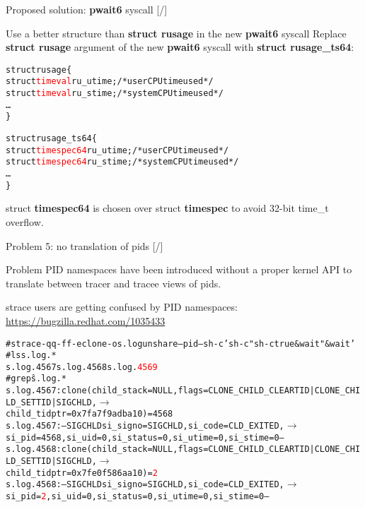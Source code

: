 \documentclass[unicode,aspectratio=169]{beamer}
\begin{document}
\begin{frame}[fragile]{Proposed solution: \textbf{pwait6} syscall \hfill [\insertframenumber/\inserttotalframenumber]}
\begin{block}{Use a better structure than \textbf{struct rusage} in the new \textbf{pwait6} syscall}
Replace \textbf{struct rusage} argument of the new \textbf{pwait6} syscall with \textbf{struct rusage\_ts64}:
\begin{alltt}
struct rusage \{
    struct \textcolor{red}{timeval} ru_utime; /* user CPU time used */
    struct \textcolor{red}{timeval} ru_stime; /* system CPU time used */
    \ldots
\}
\end{alltt}
\begin{alltt}
struct rusage_ts64 \{
    struct \textcolor{red}{timespec64} ru_utime; /* user CPU time used */
    struct \textcolor{red}{timespec64} ru_stime; /* system CPU time used */
    \ldots
\}
\end{alltt}
struct \textbf{timespec64} is chosen over struct \textbf{timespec} to avoid 32-bit time\_t overflow.
\end{block}
\end{frame}

\begin{frame}[fragile]{Problem 5: no translation of pids \hfill [\insertframenumber/\inserttotalframenumber]}
\begin{block}{Problem}
PID namespaces have been introduced without a proper kernel API
to translate between tracer and tracee views of pids.
\end{block}

\begin{block}{strace users are getting confused by PID namespaces: \\ \url{https://bugzilla.redhat.com/1035433}}
\scriptsize
\begin{alltt}
# strace -qq -ff -e clone -o s.log unshare --pid -- sh -c 'sh -c "sh -c true & wait" & wait'
# ls s.log.*
s.log.4567  s.log.4568  s.log.\textcolor{red}{4569}
# grep \^ s.log.*
s.log.4567:clone(child_stack=NULL, flags=CLONE_CHILD_CLEARTID|CLONE_CHILD_SETTID|SIGCHLD, \(\longrightarrow\)
           child_tidptr=0x7fa7f9adba10) = 4568
s.log.4567:--- SIGCHLD {si_signo=SIGCHLD, si_code=CLD_EXITED, \(\longrightarrow\)
           si_pid=4568, si_uid=0, si_status=0, si_utime=0, si_stime=0} ---
s.log.4568:clone(child_stack=NULL, flags=CLONE_CHILD_CLEARTID|CLONE_CHILD_SETTID|SIGCHLD, \(\longrightarrow\)
           child_tidptr=0x7fe0f586aa10) = \textcolor{red}{2}
s.log.4568:--- SIGCHLD {si_signo=SIGCHLD, si_code=CLD_EXITED, \(\longrightarrow\)
           si_pid=\textcolor{red}{2}, si_uid=0, si_status=0, si_utime=0, si_stime=0} ---
\end{alltt}
\end{block}
\end{frame}
\end{document}
